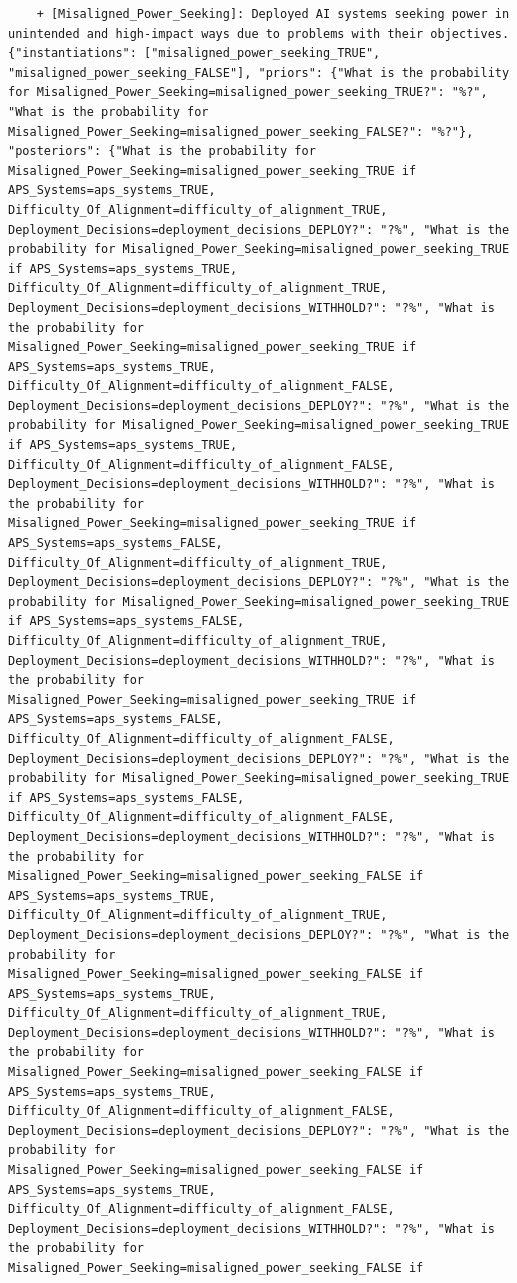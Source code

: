 \documentclass[
  11pt,
  letterpaper,
]{book}
\begin{document}
\begin{verbatim}
    + [Misaligned_Power_Seeking]: Deployed AI systems seeking power in unintended and high-impact ways due to problems with their objectives. {"instantiations": ["misaligned_power_seeking_TRUE", "misaligned_power_seeking_FALSE"], "priors": {"What is the probability for Misaligned_Power_Seeking=misaligned_power_seeking_TRUE?": "%?", "What is the probability for Misaligned_Power_Seeking=misaligned_power_seeking_FALSE?": "%?"}, "posteriors": {"What is the probability for Misaligned_Power_Seeking=misaligned_power_seeking_TRUE if APS_Systems=aps_systems_TRUE, Difficulty_Of_Alignment=difficulty_of_alignment_TRUE, Deployment_Decisions=deployment_decisions_DEPLOY?": "?%", "What is the probability for Misaligned_Power_Seeking=misaligned_power_seeking_TRUE if APS_Systems=aps_systems_TRUE, Difficulty_Of_Alignment=difficulty_of_alignment_TRUE, Deployment_Decisions=deployment_decisions_WITHHOLD?": "?%", "What is the probability for Misaligned_Power_Seeking=misaligned_power_seeking_TRUE if APS_Systems=aps_systems_TRUE, Difficulty_Of_Alignment=difficulty_of_alignment_FALSE, Deployment_Decisions=deployment_decisions_DEPLOY?": "?%", "What is the probability for Misaligned_Power_Seeking=misaligned_power_seeking_TRUE if APS_Systems=aps_systems_TRUE, Difficulty_Of_Alignment=difficulty_of_alignment_FALSE, Deployment_Decisions=deployment_decisions_WITHHOLD?": "?%", "What is the probability for Misaligned_Power_Seeking=misaligned_power_seeking_TRUE if APS_Systems=aps_systems_FALSE, Difficulty_Of_Alignment=difficulty_of_alignment_TRUE, Deployment_Decisions=deployment_decisions_DEPLOY?": "?%", "What is the probability for Misaligned_Power_Seeking=misaligned_power_seeking_TRUE if APS_Systems=aps_systems_FALSE, Difficulty_Of_Alignment=difficulty_of_alignment_TRUE, Deployment_Decisions=deployment_decisions_WITHHOLD?": "?%", "What is the probability for Misaligned_Power_Seeking=misaligned_power_seeking_TRUE if APS_Systems=aps_systems_FALSE, Difficulty_Of_Alignment=difficulty_of_alignment_FALSE, Deployment_Decisions=deployment_decisions_DEPLOY?": "?%", "What is the probability for Misaligned_Power_Seeking=misaligned_power_seeking_TRUE if APS_Systems=aps_systems_FALSE, Difficulty_Of_Alignment=difficulty_of_alignment_FALSE, Deployment_Decisions=deployment_decisions_WITHHOLD?": "?%", "What is the probability for Misaligned_Power_Seeking=misaligned_power_seeking_FALSE if APS_Systems=aps_systems_TRUE, Difficulty_Of_Alignment=difficulty_of_alignment_TRUE, Deployment_Decisions=deployment_decisions_DEPLOY?": "?%", "What is the probability for Misaligned_Power_Seeking=misaligned_power_seeking_FALSE if APS_Systems=aps_systems_TRUE, Difficulty_Of_Alignment=difficulty_of_alignment_TRUE, Deployment_Decisions=deployment_decisions_WITHHOLD?": "?%", "What is the probability for Misaligned_Power_Seeking=misaligned_power_seeking_FALSE if APS_Systems=aps_systems_TRUE, Difficulty_Of_Alignment=difficulty_of_alignment_FALSE, Deployment_Decisions=deployment_decisions_DEPLOY?": "?%", "What is the probability for Misaligned_Power_Seeking=misaligned_power_seeking_FALSE if APS_Systems=aps_systems_TRUE, Difficulty_Of_Alignment=difficulty_of_alignment_FALSE, Deployment_Decisions=deployment_decisions_WITHHOLD?": "?%", "What is the probability for Misaligned_Power_Seeking=misaligned_power_seeking_FALSE if 
\end{verbatim}
\end{document}
